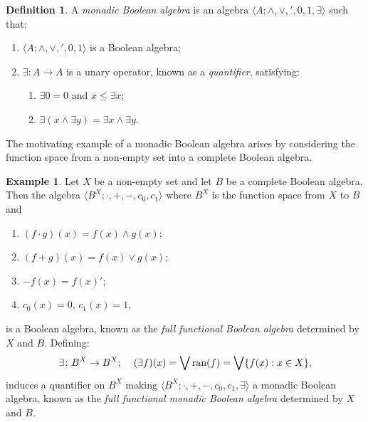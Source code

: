 \documentclass[reqno]{amsart}
\theoremstyle{plain}
\theoremstyle{definition}
\newtheorem{definition}[theorem]{Definition}
\newtheorem{example}[theorem]{Example}
\begin{document}
\begin{definition}\label{monadic ortholattice}
A \emph{monadic Boolean algebra} is an algebra $\langle A;\wedge,\vee,',0,1,\exists\rangle$ such that: 
\begin{enumerate}
    \item $\langle A;\wedge,\vee,',0,1\rangle$ is a Boolean algebra;
    \item $\exists\colon A\to A$ is a unary operator, known as a \emph{quantifier}, satisfying:
        \begin{enumerate}
        \item $\exists 0=0$ and $x\leq \exists x$;
        \item $\exists(x\wedge\exists y)=\exists x\wedge\exists y$. 
    \end{enumerate}
\end{enumerate}
\end{definition}
The motivating example of a monadic Boolean algebra arises by considering the function space from a non-empty set into a complete Boolean algebra. 
\begin{example}
    Let $X$ be a non-empty set and let $B$ be a complete Boolean algebra. Then the algebra $\langle B^X;\cdot,+,-,c_0,c_1\rangle$ where  $B^X$ is the function space from $X$ to $B$ and 
    \begin{enumerate} 
        \item $(f\cdot g)(x)=f(x)\wedge g(x)$; 
        \item $(f+g)(x)=f(x)\vee g(x)$; 
        \item $-f(x)=f(x)'$; 
        \item $c_0(x)=0$, $c_1(x)=1$, 
    \end{enumerate}
    is a Boolean algebra, known as the \emph{full functional Boolean algebra} determined by $X$ and $B$. Defining: 
    \[\exists\colon B^X\to B^X;\hspace{.4cm}(\exists f)(x)=\bigvee\text{ran}(f)=\bigvee\{f(x):x\in X\},\] induces a quantifier on $B^X$ making $\langle B^X;\cdot,+,-,c_0,c_1,\exists\rangle$ a monadic Boolean algebra, known as the \emph{full functional monadic Boolean algebra} determined by $X$ and $B$.   
\end{example}
\end{document}
